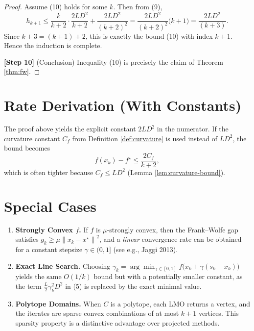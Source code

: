 \documentclass{article}
\newcommand{\norm}[1]{\left\lVert#1\right\rVert}
\begin{document}
\begin{proof}
Assume (10) holds for some $k$. Then from (9),
\[
h_{k+1}\le \frac{k}{k+2}\cdot\frac{2LD^2}{k+2}
          +\frac{2LD^2}{(k+2)^2}
        = \frac{2LD^2}{(k+2)^2}\bigl(k+1\bigr)
        = \frac{2LD^2}{(k+3)} .
\]
Since $k+3 = (k+1)+2$, this is exactly the bound (10) with index $k+1$. Hence the induction is complete.

\textbf{[Step 10]} (Conclusion)  
Inequality (10) is precisely the claim of Theorem \ref{thm:fw}. \qedhere
\end{proof}

\section*{Rate Derivation (With Constants)}
The proof above yields the explicit constant $2LD^2$ in the numerator.  
If the curvature constant $C_f$ from Definition \ref{def:curvature} is used instead of $LD^2$, the bound becomes
\[
f(x_k)-f^\star \le \frac{2C_f}{k+2},
\]
which is often tighter because $C_f\le LD^2$ (Lemma \ref{lem:curvature-bound}).

\section*{Special Cases}
\begin{enumerate}[label=\alph*.]
    \item \textbf{Strongly Convex $f$.} If $f$ is $\mu$‑strongly convex, then the Frank–Wolfe gap satisfies $g_k\ge \mu \norm{x_k-x^\star}^2$, and a \emph{linear} convergence rate can be obtained for a constant stepsize $\gamma\in(0,1]$ (see e.g., Jaggi 2013).
    \item \textbf{Exact Line Search.} Choosing $\gamma_k=\arg\min_{\gamma\in[0,1]} f\bigl(x_k+\gamma(s_k-x_k)\bigr)$ yields the same $O(1/k)$ bound but with a potentially smaller constant, as the term $\frac{L}{2}\gamma_k^2 D^2$ in (5) is replaced by the exact minimal value.
    \item \textbf{Polytope Domains.} When $C$ is a polytope, each LMO returns a vertex, and the iterates are sparse convex combinations of at most $k+1$ vertices. This sparsity property is a distinctive advantage over projected methods.
\end{enumerate}
\end{document}
